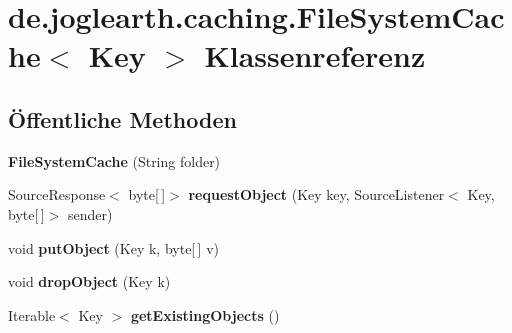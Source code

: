 \section{de.\-joglearth.\-caching.\-File\-System\-Cache$<$ \-Key $>$ \-Klassenreferenz}
\label{classde_1_1joglearth_1_1caching_1_1_file_system_cache_3_01_key_01_4}
\subsection*{Öffentliche \-Methoden}
\begin{DoxyCompactItemize}
\item 
{\bfseries \-File\-System\-Cache} (\-String folder)\label{classde_1_1joglearth_1_1caching_1_1_file_system_cache_3_01_key_01_4_a28751da2656ace2ecc9e0275c98c142e}

\item 
\-Source\-Response$<$ byte[$\,$]$>$ {\bfseries request\-Object} (\-Key key, \-Source\-Listener$<$ \-Key, byte[$\,$]$>$ sender)\label{classde_1_1joglearth_1_1caching_1_1_file_system_cache_3_01_key_01_4_a34b649126fadce4f124e3ad0e596b570}

\item 
void {\bfseries put\-Object} (\-Key k, byte[$\,$] v)\label{classde_1_1joglearth_1_1caching_1_1_file_system_cache_3_01_key_01_4_a0e31b94259fd3f6549c72d8d313d5ec0}

\item 
void {\bfseries drop\-Object} (\-Key k)\label{classde_1_1joglearth_1_1caching_1_1_file_system_cache_3_01_key_01_4_aa2a5b8b045d16e5cc65e009c34e8cd36}

\item 
\-Iterable$<$ \-Key $>$ {\bfseries get\-Existing\-Objects} ()\label{classde_1_1joglearth_1_1caching_1_1_file_system_cache_3_01_key_01_4_a7024abb321232af58c588ca8ae1ad8b6}

\end{DoxyCompactItemize}
